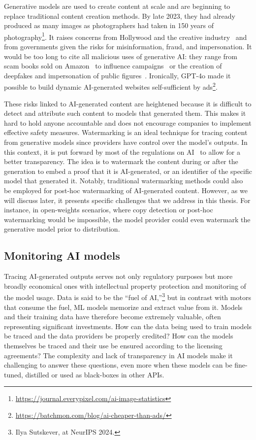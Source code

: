 Generative models are used to create content at scale and are beginning to replace traditional content creation methods. 
By late 2023, they had already produced as many images as photographers had taken in 150 years of photography\footnote{\scriptsize\url{https://journal.everypixel.com/ai-image-statistics}}.
It raises concerns from Hollywood and the creative industry~\citep{coyle2023chatgpt} and from governments given the risks for misinformation, fraud, and impersonation.
It would be too long to cite all malicious uses of generative AI: they range from scam books sold on Amazon~\citep{knibbs2024scammy} to influence campaigns~\citep{goldstein2023generative} or the creation of deepfakes and impersonation of public figures~\citep{harris2018deepfakes, shen2019fake}.
Ironically, GPT-4o made it possible to build dynamic AI-generated websites self-sufficient by ads\footnote{\scriptsize\url{https://batchmon.com/blog/ai-cheaper-than-ads/}}.

These risks linked to AI-generated content are heightened because it is difficult to detect and attribute such content to models that generated them.
This makes it hard to hold anyone accountable and does not encourage companies to implement effective safety measures. 
Watermarking is an ideal technique for tracing content from generative models since providers have control over the model's outputs.
In this context, it is put forward by most of the regulations on AI~\citep{USAIAnnouncement, ChineseAIGovernance, EuropeanAIAct} to allow for a better transparency.
The idea is to watermark the content during or after the generation to embed a proof that it is AI-generated, or an identifier of the specific model that generated it.
Notably, traditional watermarking methods could also be employed for post-hoc watermarking of AI-generated content. However, as we will discuss later, it presents specific challenges that we address in this thesis.
For instance, in open-weights scenarios, where copy detection or post-hoc watermarking would be impossible, the model provider could even watermark the generative model prior to distribution.



\subsection*{Monitoring AI models}

Tracing AI-generated outputs serves not only regulatory purposes but more broadly economical ones with intellectual property protection and monitoring of the model usage.
Data is said to be the ``fuel of AI,''\footnote{\scriptsize Ilya Sutskever, at NeurIPS 2024.} but in contrast with motors that consume the fuel, ML models memorize and extract value from it.
Models and their training data have therefore become extremely valuable, often representing significant investments. 
How can the data being used to train models be traced and the data providers be properly credited?
How can the models themselves be traced and their use be ensured according to the licensing agreements?
The complexity and lack of transparency in AI models make it challenging to answer these questions, even more when these models can be fine-tuned, distilled or used as black-boxes in other APIs.

